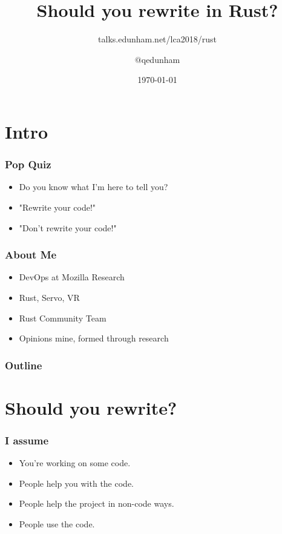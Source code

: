\documentclass{beamer}
\title{Should you rewrite in Rust?}
\subtitle{talks.edunham.net/lca2018/rust}
\author{$@$qedunham}
\institute{LinuxConf Australia}
\date{\today}
\begin{document}
\begin{frame}[fragile]
\titlepage
\end{frame}


\section{Intro}

\begin{frame}[fragile]
\frametitle{Pop Quiz}
\begin{itemize}[<+(1)->]
\item Do you know what I'm here to tell you?
\item "Rewrite your code!"
\item "Don't rewrite your code!"
\end{itemize}
\end{frame}


\begin{frame}[fragile]
\frametitle{About Me}
\begin{itemize}[<+(1)->]
\item DevOps at Mozilla Research
\item Rust, Servo, VR
\item Rust Community Team
\item Opinions mine, formed through research
\end{itemize}
\end{frame}

\begin{frame}[fragile]
\frametitle{Outline}
\tableofcontents[pausesections]
\end{frame}

\section{Should you rewrite?}

\begin{frame}[fragile]
\tableofcontents[currentsection]
\end{frame}

\begin{frame}[fragile]
\frametitle{I assume}
\begin{itemize}[<+(1)->]
\item You're working on some code.
\item People help you with the code.
\item People help the project in non-code ways.
\item People use the code.
\end{itemize}
\end{frame}
\end{document}
